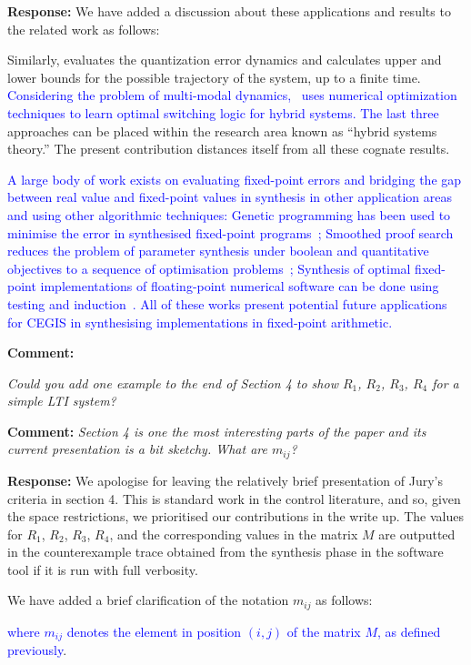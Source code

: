 \documentclass{article}
\newcommand{\rev}[1]{\textcolor{blue}{#1}}
\begin{document}
\vspace{1em}
{\bf Response: }
We have added a discussion about these applications and results to the related work as follows:

\vspace{2em}
Similarly, 
\cite{liberzon2003hybrid} evaluates the quantization error dynamics and calculates upper and lower
bounds for the possible trajectory of the system, up to a finite time. \rev{Considering the problem of multi-modal
dynamics,~\cite{DBLP:conf/emsoft/JhaST11} uses numerical optimization techniques to learn optimal switching logic for hybrid systems.
The last three} approaches can be placed within the research area known as ``hybrid systems theory.''  
The present contribution distances itself from all these cognate results. 

\rev{A large body of work exists on evaluating fixed-point errors and bridging the gap between real value
and fixed-point values in synthesis in other application areas and using other
algorithmic techniques:
Genetic programming has been used to minimise the error in synthesised fixed-point programs~\cite{DBLP:conf/emsoft/DarulovaKMS13};
Smoothed proof search reduces the problem of parameter synthesis under boolean and quantitative 
objectives to a sequence of optimisation problems~\cite{DBLP:conf/popl/ChaudhuriCS14}; Synthesis of 
optimal fixed-point implementations of floating-point numerical software can be done using testing and induction~\cite{DBLP:journals/corr/abs-1302-1920}.
All of these works present potential future applications for CEGIS in synthesising implementations in fixed-point arithmetic.}

\vspace{2em}
{\bf Comment: } {\itshape 
Could you add one example to the end of Section 4 to show $R_1$, $R_2$, $R_3$, $R_4$ for a simple LTI system? 

{\bf Comment: } {\itshape 
Section 4 is one the most interesting parts
of the paper and its current presentation is a bit sketchy. What are $m_{ij}$?} } 

\vspace{1em}
{\bf Response: }
We apologise for leaving the relatively brief presentation of Jury's criteria in section 4. This is standard
work in the control literature, and so, given the space restrictions, we prioritised our contributions in the write up. 
The values for $R_1$, $R_2$, $R_3$, $R_4$, and the corresponding values in the matrix $M$ are outputted in the counterexample
trace obtained from the synthesis phase in the software tool 
if it is run with full verbosity.

We have added a brief clarification of the notation $m_{ij}$ as follows:

\rev{where $m_{ij}$ denotes the element in position $(i,j)$ of the matrix $M$, as defined previously}.




\end{document}
